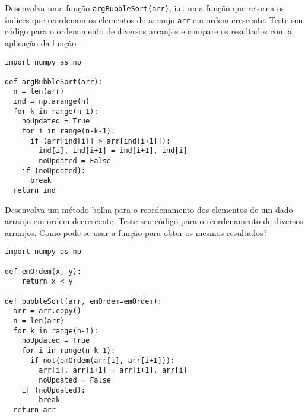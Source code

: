 \begin{exer}
  Desenvolva uma função \lstinline+argBubbleSort(arr)+, i.e. uma função que retorna os índices que reordenam os elementos do arranjo \lstinline+arr+ em ordem crescente. Teste seu código para o ordenamento de diversos arranjos e compare os resultados com a aplicação da função {\PYTHONnumpyDOTargsort}.
\end{exer}
\begin{resp}

\begin{lstlisting}
import numpy as np

def argBubbleSort(arr):
  n = len(arr)
  ind = np.arange(n)
  for k in range(n-1):
    noUpdated = True
    for i in range(n-k-1):
      if (arr[ind[i]] > arr[ind[i+1]]):
        ind[i], ind[i+1] = ind[i+1], ind[i]
        noUpdated = False
    if (noUpdated):
      break
  return ind
\end{lstlisting}

\end{resp}

\begin{exer}
  Desenvolva um método bolha para o reordenamento dos elementos de um dado arranjo em ordem decrescente. Teste seu código para o reordenamento de diversos arranjos. Como pode-se usar a função {\PYTHONnumpyDOTsort} para obter os mesmos resultados?
\end{exer}
\begin{resp}

\begin{lstlisting}
import numpy as np

def emOrdem(x, y):
    return x < y

def bubbleSort(arr, emOrdem=emOrdem):
  arr = arr.copy()
  n = len(arr)
  for k in range(n-1):
    noUpdated = True
    for i in range(n-k-1):
      if not(emOrdem(arr[i], arr[i+1])):
        arr[i], arr[i+1] = arr[i+1], arr[i]
        noUpdated = False
    if (noUpdated):
        break
  return arr
\end{lstlisting}

\end{resp}

